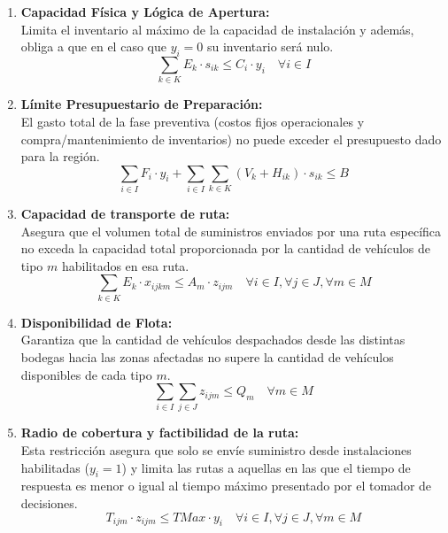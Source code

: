 \documentclass[letterpaper]{article}
\begin{document}
\begin{flushleft}
\begin{enumerate}
    \item \textbf{Capacidad F\'isica y L\'ogica de Apertura:}\\
    Limita el inventario al m\'aximo de la capacidad de instalaci\'on y adem\'as, obliga a que en el caso que $y_i = 0$ su inventario ser\'a nulo.
    \begin{equation}
        \sum_{k \in K} E_k \cdot s_{ik} \leq C_i \cdot y_i \quad \forall i \in I
    \end{equation}

    \item \textbf{L\'imite Presupuestario de Preparaci\'on:}\\
    El gasto total de la fase preventiva (costos fijos operacionales y compra/mantenimiento de inventarios) no puede exceder el presupuesto dado para la regi\'on.
    \begin{equation}
        \sum_{i \in I} F_i \cdot y_i + \sum_{i \in I}\sum_{k \in K} (V_k + H_{ik}) \cdot s_{ik} \leq B
    \end{equation}

    \item \textbf{Capacidad de transporte de ruta:}\\
    Asegura que el volumen total de suministros enviados por una ruta espec\'ifica no exceda la capacidad total proporcionada por la cantidad de veh\'iculos de tipo $m$ habilitados en esa ruta.
    \begin{equation}
        \sum_{k \in K} E_k \cdot x_{ijkm} \leq A_m \cdot z_{ijm} \quad \forall i \in I, \forall j \in J, \forall m \in M
    \end{equation}

    \item \textbf{Disponibilidad de Flota:}\\
    Garantiza que la cantidad de veh\'iculos despachados desde las distintas bodegas hacia las zonas afectadas no supere la cantidad de veh\'iculos disponibles de cada tipo $m$.
    \begin{equation}
        \sum_{i \in I} \sum_{j \in J} z_{ijm} \leq Q_m \quad \forall m \in M
    \end{equation}

    \item \textbf{Radio de cobertura y factibilidad de la ruta:}\\
    Esta restricci\'on asegura que solo se env\'ie suministro desde instalaciones habilitadas ($y_i = 1$) y limita las rutas a aquellas en las que el tiempo de respuesta es menor o igual al tiempo m\'aximo presentado por el tomador de decisiones.
    \begin{equation}
        T_{ijm} \cdot z_{ijm} \leq TMax \cdot y_i \quad \forall i \in I, \forall j \in J, \forall m \in M
    \end{equation}


\end{enumerate}
\end{flushleft}
\end{document}
